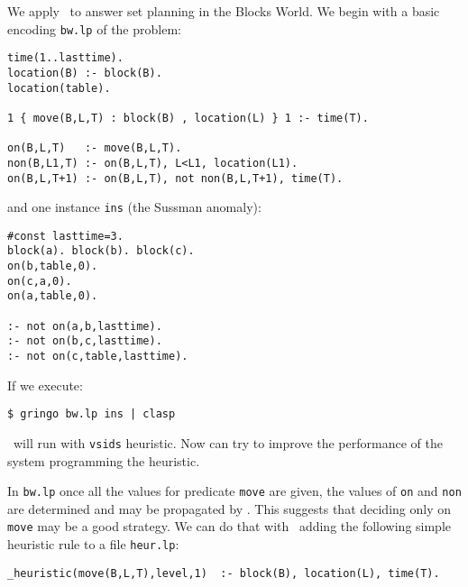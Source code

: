  We apply \clasp\ to answer set planning in the Blocks World.  We begin with a basic encoding \texttt{bw.lp} of the problem: 
\begin{verbatim}
time(1..lasttime).                                                                                                                                                                                         
location(B) :- block(B).                                                                                            
location(table).                                                                                                    
                                                                                                                    
1 { move(B,L,T) : block(B) , location(L) } 1 :- time(T).                                           
                                                                                                                    
on(B,L,T)   :- move(B,L,T).                                                                             
non(B,L1,T) :- on(B,L,T), L<L1, location(L1). 
on(B,L,T+1) :- on(B,L,T), not non(B,L,T+1), time(T). \end{verbatim}

 and one instance \texttt{ins} (the Sussman anomaly): 
\begin{verbatim}
#const lasttime=3.
block(a). block(b). block(c).
on(b,table,0). 
on(c,a,0).
on(a,table,0).

:- not on(a,b,lasttime).
:- not on(b,c,lasttime).
:- not on(c,table,lasttime).
\end{verbatim}

If we execute:
\begin{verbatim}
$ gringo bw.lp ins | clasp \end{verbatim}

\clasp\ will run with \texttt{vsids} heuristic. Now can try to improve the performance of the system programming the heuristic. 

 In \texttt{bw.lp} once all the values for predicate \texttt{move} are given,  
 the values of \texttt{on} and \texttt{non} are determined and may be propagated by \clasp. 
 This suggests that deciding only on \texttt{move} may be a good strategy. 
 We can do that with \clasp\ adding the following simple heuristic rule to a file \texttt{heur.lp}: 

\begin{verbatim}
_heuristic(move(B,L,T),level,1)  :- block(B), location(L), time(T).\end{verbatim}

